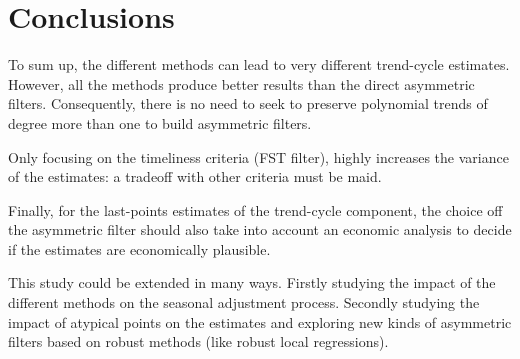 \documentclass[
  12pt,
  ,
  a4paper]{article}
\begin{document}
\hypertarget{conclusions}{%
\section{Conclusions}\label{conclusions}}

To sum up, the different methods can lead to very different trend-cycle estimates.
However, all the methods produce better results than the direct asymmetric filters.
Consequently, there is no need to seek to preserve polynomial trends of degree more than one to build asymmetric filters.

Only focusing on the timeliness criteria (FST filter), highly increases the variance of the estimates: a tradeoff with other criteria must be maid.

Finally, for the last-points estimates of the trend-cycle component, the choice off the asymmetric filter should also take into account an economic analysis to decide if the estimates are economically plausible.

This study could be extended in many ways.
Firstly studying the impact of the different methods on the seasonal adjustment process. Secondly studying the impact of atypical points on the estimates and exploring new kinds of asymmetric filters based on robust methods (like robust local regressions).

\renewcommand\refname{References}
  
\end{document}
